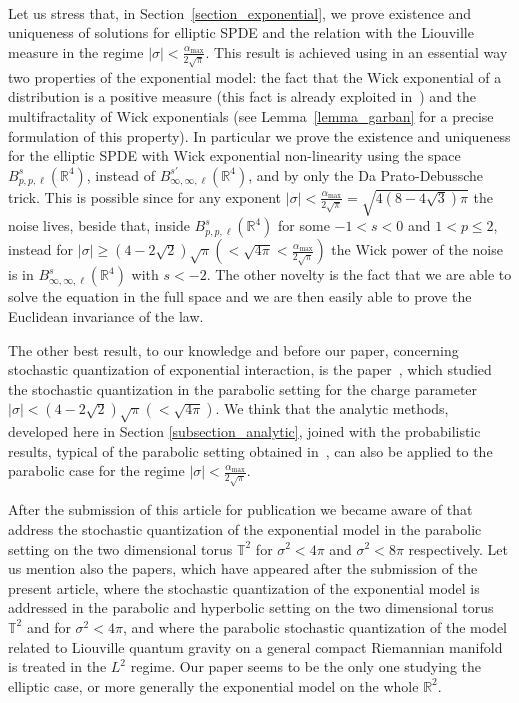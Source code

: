 \documentclass[a4paper,10pt]{article}
\begin{document}
\

Let us stress that, in Section~\ref{section_exponential}, we prove existence
and uniqueness of solutions for elliptic SPDE and the relation with the
Liouville measure in the regime $| \sigma | < \frac{\alpha_{\text{max}}}{2\sqrt{\pi}}$. This result is achieved using in an essential way two
properties of the exponential model: the fact that the Wick exponential of a
distribution is a positive measure (this fact is already exploited
in~{\cite{Garban2018}}) and the multifractality of Wick exponentials (see
Lemma~\ref{lemma_garban} for a precise formulation of this property). In
particular we prove the existence and uniqueness for the elliptic SPDE with
Wick exponential non-linearity using the space $B^s_{p, p, \ell}
(\mathbb{R}^4)$, instead of $B^{s'}_{\infty, \infty, \ell} (\mathbb{R}^4)$,
and by only the Da Prato-Debussche trick. This is possible since for any
exponent $| \sigma | <\frac{\alpha_{\text{max}}}{2\sqrt{\pi}}= \sqrt{4 \left( 8 - 4 \sqrt{3} \right) \pi}$ the noise
lives, beside that, inside $B^s_{p, p, \ell} (\mathbb{R}^4)$ for some $- 1 < s
< 0$ and $1 < p \leqslant 2$, instead for $| \sigma | \geqslant \left( 4 - 2
\sqrt{2} \right) \sqrt{\pi} \left( < \sqrt{4 \pi} < \frac{\alpha_{\text{max}}}{2\sqrt{\pi}} \right)$ the Wick power of the noise is in $B^s_{\infty,
\infty, \ell} (\mathbb{R}^4)$ with $s < - 2$. The other novelty is the fact
that we are able to solve the equation in the full space and we are then
easily able to prove the Euclidean invariance of the law.

The other best result, to our knowledge and before our paper, concerning
stochastic quantization of exponential interaction, is the
paper~{\cite{Garban2018}}, which studied the stochastic quantization in the
parabolic setting for the charge parameter $| \sigma | < \left( 4 - 2 \sqrt{2}
\right) \sqrt{\pi} \left( < \sqrt{4 \pi} \right)$. We think that the analytic
methods, developed here in Section \ref{subsection_analytic}, joined with the
probabilistic results, typical of the parabolic setting obtained
in~{\cite{Garban2018}}, can also be applied to the parabolic case for the
regime $| \sigma | < \frac{\alpha_{\text{max}}}{2\sqrt{\pi}}$.

After the submission of this article for publication we became aware of
{\cite{HoKaKu,HoKaKu2020}} that address the stochastic quantization of the
exponential model in the parabolic setting on the two dimensional torus
$\mathbb{T}^2$ for $\sigma^2 < 4 \pi$ and $\sigma^2 < 8 \pi$ respectively. Let
us mention also the papers, which have appeared after the submission of the
present article, {\cite{OhTriYu}} where the stochastic quantization of the
exponential model is addressed in the parabolic and hyperbolic setting on the
two dimensional torus $\mathbb{T}^2$ and for $\sigma^2 < 4 \pi$, and
{\cite{OhTriYu2020}} where the parabolic stochastic quantization of the model
related to Liouville quantum gravity on a general compact Riemannian manifold
is treated in the $L^2$ regime. Our paper seems to be the only one studying
the elliptic case, or more generally the exponential model on the whole
$\mathbb{R}^2$. \ \
\end{document}
